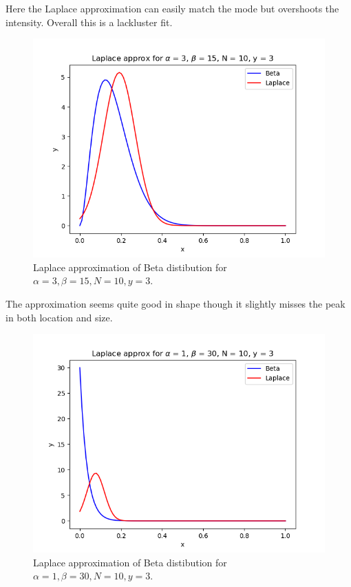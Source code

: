 \documentclass[10pt]{article}
\begin{document}
\begin{itemize}
Here the Laplace approximation can easily match the mode but overshoots the intensity. Overall this is a lackluster fit. 

\begin{figure}[H]
\centering
  \includegraphics[width=\linewidth]{laplace2.png}
 \caption{Laplace approximation of Beta distibution for $\alpha = 3, \beta = 15, N = 10, y = 3$.}
\label{label}
\end{figure}

The approximation seems quite good in shape though it slightly misses the peak in both location and size.

\begin{figure}[H]
\centering
  \includegraphics[width=\linewidth]{laplace3.png}
 \caption{Laplace approximation of Beta distibution for $\alpha = 1, \beta = 30, N = 10, y = 3$.}
\label{label}
\end{figure}


\end{itemize}
\end{document}
